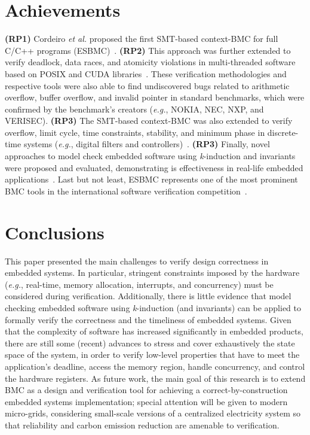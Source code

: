 \documentclass{acm_sen_article}
\begin{document}
\section{Achievements}
\label{achievements}

\textbf{(RP1)} Cordeiro {\it et al.} proposed the first SMT-based context-BMC for full C/C++ programs (ESBMC)~\cite{Cordeiro12,ECBS13}. \textbf{(RP2)} This approach was further extended to verify deadlock, data races, and atomicity violations in multi-threaded software based on POSIX and CUDA libraries~\cite{CordeiroF11,Pereira15}. These verification methodologies and respective tools were also able to find undiscovered bugs related to arithmetic overflow, buffer overflow, and invalid pointer in standard benchmarks, which were confirmed by the benchmark’s creators ({\it e.g.}, NOKIA, NEC, NXP, and VERISEC). \textbf{(RP3)} The SMT-based context-BMC was also extended to verify overflow, limit cycle, time constraints, stability, and minimum phase in discrete-time systems ({\it e.g.}, digital filters and controllers)~\cite{esbmc_controller,dsv_spin2015,esbmc_filter}. \textbf{(RP3)} Finally, novel approaches to model check embedded software using \textit{k}-induction and invariants were proposed and evaluated, demonstrating is effectiveness in real-life embedded applications~\cite{Gadelha15,Rocha15}. Last but not least, ESBMC represents one of the most prominent BMC tools in the international software verification competition~\cite{MorseCNF13,MorseRCN014}.

\section{Conclusions}
\label{conclusions}

This paper presented the main challenges to verify design correctness in embedded systems. In particular, stringent constraints imposed by the hardware ({\it e.g.}, real-time, memory allocation, interrupts, and concurrency) must be considered during verification. Additionally, there is little evidence that model checking embedded software using \textit{k}-induction (and invariants) can be applied to formally verify the correctness and the timeliness of embedded systems. Given that the complexity of software has increased significantly in embedded products, there are still some (recent) advances to stress and cover exhaustively the state space of the system, in order to verify low-level properties that have to meet the application's deadline, access the memory region, handle concurrency, and control the hardware registers. As future work, the main goal of this research is to extend BMC as a design and verification tool for achieving a correct-by-construction embedded systems implementation; special attention will be given to modern micro-grids, considering small-scale versions of a centralized electricity system so that reliability and carbon emission reduction are amenable to verification.
\end{document}
